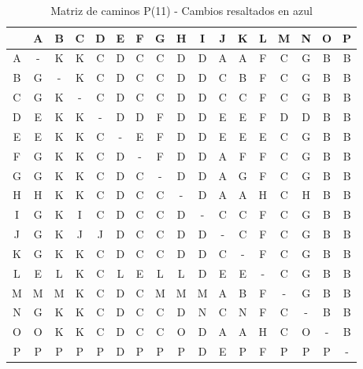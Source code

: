 \documentclass[12pt]{article}
\begin{document}
\begin{table}[h!]
\centering
\begin{tabular}{|c|c|c|c|c|c|c|c|c|c|c|c|c|c|c|c|c|}
\hline
 & A & B & C & D & E & F & G & H & I & J & K & L & M & N & O & P \\\hline
A & - & \cellcolor{lightblue} K & \cellcolor{lightblue} K & \cellcolor{lightblue} C & D & C & C & D & D & A & A & F & C & G & B & B \\\hline
B & G & - & \cellcolor{lightblue} K & \cellcolor{lightblue} C & D & \cellcolor{lightblue} C & \cellcolor{lightblue} C & D & D & \cellcolor{lightblue} C & B & F & \cellcolor{lightblue} C & G & B & B \\\hline
C & G & \cellcolor{lightblue} K & - & C & D & C & C & D & D & C & C & F & C & G & B & B \\\hline
D & E & \cellcolor{lightblue} K & \cellcolor{lightblue} K & - & D & D & F & D & D & E & E & F & D & D & B & B \\\hline
E & E & \cellcolor{lightblue} K & \cellcolor{lightblue} K & \cellcolor{lightblue} C & - & E & F & D & D & E & E & E & \cellcolor{lightblue} C & G & B & B \\\hline
F & G & \cellcolor{lightblue} K & \cellcolor{lightblue} K & \cellcolor{lightblue} C & D & - & F & D & D & A & F & F & \cellcolor{lightblue} C & G & B & B \\\hline
G & G & \cellcolor{lightblue} K & \cellcolor{lightblue} K & \cellcolor{lightblue} C & D & C & - & D & D & A & G & F & C & G & B & B \\\hline
H & H & \cellcolor{lightblue} K & \cellcolor{lightblue} K & \cellcolor{lightblue} C & D & C & C & - & D & A & A & H & C & H & B & B \\\hline
I & G & \cellcolor{lightblue} K & I & C & D & C & C & D & - & C & C & F & C & G & B & B \\\hline
J & G & \cellcolor{lightblue} K & J & J & D & C & C & D & D & - & C & F & C & G & B & B \\\hline
K & G & K & K & C & D & C & C & D & D & C & - & F & C & G & B & B \\\hline
L & E & L & \cellcolor{lightblue} K & \cellcolor{lightblue} C & L & E & L & L & D & E & E & - & \cellcolor{lightblue} C & G & B & B \\\hline
M & M & M & \cellcolor{lightblue} K & C & D & \cellcolor{lightblue} C & M & M & M & A & B & \cellcolor{lightblue} F & - & G & B & B \\\hline
N & G & \cellcolor{lightblue} K & \cellcolor{lightblue} K & C & D & \cellcolor{lightblue} C & \cellcolor{lightblue} C & D & N & \cellcolor{lightblue} C & N & F & C & - & B & B \\\hline
O & O & \cellcolor{lightblue} K & \cellcolor{lightblue} K & \cellcolor{lightblue} C & D & C & C & O & D & A & A & H & C & O & - & B \\\hline
P & P & P & P & P & D & P & P & P & D & E & P & F & P & P & P & - \\\hline
\end{tabular}
\caption{Matriz de caminos P(11) - Cambios resaltados en azul}
\end{table}
\end{document}
